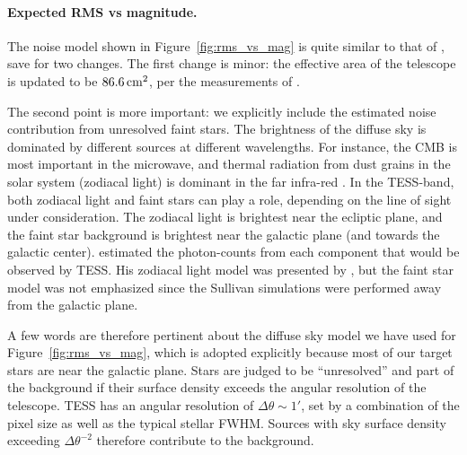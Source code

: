 \documentclass[12pt,twocolumn,tighten]{aastex62}
\begin{document}
\paragraph{Expected RMS vs magnitude.}

The noise model shown in Figure~\ref{fig:rms_vs_mag} is quite similar
to that of \citet{Sullivan_et_al_2015}, save for two changes.
The first change is minor: the effective area of the telescope is
updated to be $86.6\,{\rm cm}^2$, per the measurements of
\citet{vanderspek_2018}.

The second point is more important: we explicitly include the
estimated noise contribution from unresolved faint stars.  The
brightness of the diffuse sky is dominated by different sources at
different wavelengths.  For instance, the CMB is most important in
the microwave, and thermal radiation from dust grains in the solar
system (zodiacal light) is dominant in the far infra-red
\citep{leinert_1997_1998}.  In the TESS-band, both zodiacal light and
faint stars can play a role, depending on the line of sight under
consideration. The zodiacal light is brightest near the ecliptic
plane, and the faint star background is brightest near the galactic
plane (and towards the galactic center).  \citet{winn_background_2013}
estimated the photon-counts from each component that would be observed 
by TESS.
His zodiacal light model was presented by \citet{Sullivan_et_al_2015},
but the faint star model was not emphasized since the Sullivan
simulations were performed away from the galactic plane.

A few words are therefore pertinent about the diffuse sky model we
have used for Figure~\ref{fig:rms_vs_mag}, which is adopted explicitly
because most of our target stars are near the galactic plane.
Stars are judged to be ``unresolved'' and part of the background if
their surface density exceeds the angular resolution of the telescope.
TESS has an angular resolution of $\Delta \theta \sim 1'$, set by a
combination of the pixel size as well as the typical stellar FWHM.
Sources with sky surface density exceeding $\Delta \theta^{-2}$
therefore contribute to the background.
\end{document}
